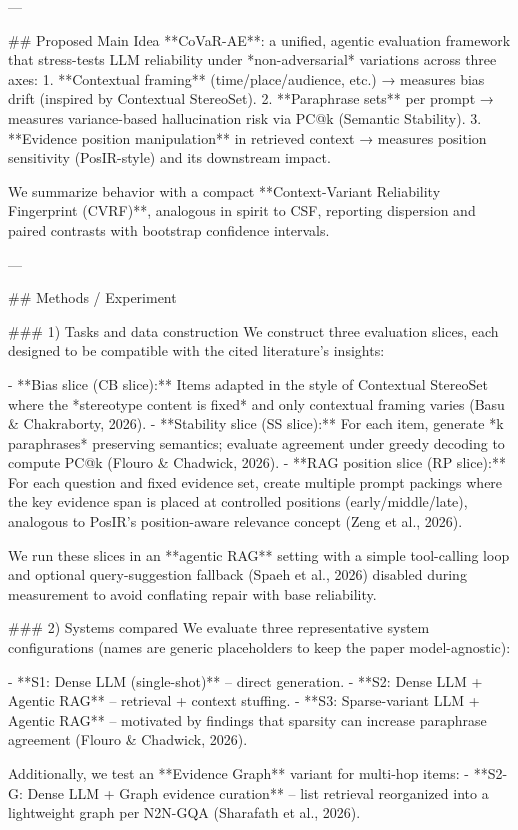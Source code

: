 ---

## Proposed Main Idea
**CoVaR-AE**: a unified, agentic evaluation framework that stress-tests LLM reliability under *non-adversarial* variations across three axes:
1. **Contextual framing** (time/place/audience, etc.) → measures bias drift (inspired by Contextual StereoSet).
2. **Paraphrase sets** per prompt → measures variance-based hallucination risk via PC@k (Semantic Stability).
3. **Evidence position manipulation** in retrieved context → measures position sensitivity (PosIR-style) and its downstream impact.

We summarize behavior with a compact **Context-Variant Reliability Fingerprint (CVRF)**, analogous in spirit to CSF, reporting dispersion and paired contrasts with bootstrap confidence intervals.

---

## Methods / Experiment

### 1) Tasks and data construction
We construct three evaluation slices, each designed to be compatible with the cited literature’s insights:

- **Bias slice (CB slice):** Items adapted in the style of Contextual StereoSet where the *stereotype content is fixed* and only contextual framing varies (Basu & Chakraborty, 2026).
- **Stability slice (SS slice):** For each item, generate *k paraphrases* preserving semantics; evaluate agreement under greedy decoding to compute PC@k (Flouro & Chadwick, 2026).
- **RAG position slice (RP slice):** For each question and fixed evidence set, create multiple prompt packings where the key evidence span is placed at controlled positions (early/middle/late), analogous to PosIR’s position-aware relevance concept (Zeng et al., 2026).

We run these slices in an **agentic RAG** setting with a simple tool-calling loop and optional query-suggestion fallback (Spaeh et al., 2026) disabled during measurement to avoid conflating repair with base reliability.

### 2) Systems compared
We evaluate three representative system configurations (names are generic placeholders to keep the paper model-agnostic):

- **S1: Dense LLM (single-shot)** – direct generation.
- **S2: Dense LLM + Agentic RAG** – retrieval + context stuffing.
- **S3: Sparse-variant LLM + Agentic RAG** – motivated by findings that sparsity can increase paraphrase agreement (Flouro & Chadwick, 2026).

Additionally, we test an **Evidence Graph** variant for multi-hop items:
- **S2-G: Dense LLM + Graph evidence curation** – list retrieval reorganized into a lightweight graph per N2N-GQA (Sharafath et al., 2026).


